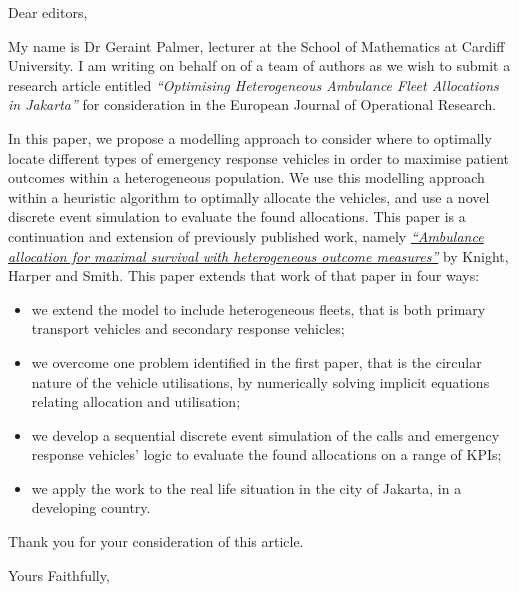 \documentclass{letter}
\begin{document}
\begin{letter}{}
\opening{Dear editors,}

My name is Dr Geraint Palmer, lecturer at the School of Mathematics at Cardiff University. I am writing on behalf on of a team of authors as we wish to submit a research article entitled \textit{``Optimising Heterogeneous Ambulance Fleet Allocations in Jakarta''} for consideration in the European Journal of Operational Research.

In this paper, we propose a modelling approach to consider where to optimally locate different types of emergency response vehicles in order to maximise patient outcomes within a heterogeneous population. We use this modelling approach within a heuristic algorithm to optimally allocate the vehicles, and use a novel discrete event simulation to evaluate the found allocations.
This paper is a continuation and extension of previously published work, namely \href{https://www.sciencedirect.com/science/article/pii/S0305048312000436?casa_token=1SiRonMwOYIAAAAA:AnZOLnmzNdYATlXDMYjqnQHEZX701o1eaBypnyMpgQbqoR62Z57aX1SXAadw4GJAku8gNvc}{\textit{``Ambulance allocation for maximal survival with heterogeneous outcome measures''}} by Knight, Harper and Smith.
This paper extends that work of that paper in four ways:

\begin{itemize}
  \item we extend the model to include heterogeneous fleets, that is both primary transport vehicles and secondary response vehicles;
  \item we overcome one problem identified in the first paper, that is the circular nature of the vehicle utilisations, by numerically solving implicit equations relating allocation and utilisation;
  \item we develop a sequential discrete event simulation of the calls and emergency response vehicles' logic to evaluate the found allocations on a range of KPIs;
  \item we apply the work to the real life situation in the city of Jakarta, in a developing country.
\end{itemize}

Thank you for your consideration of this article.

\closing{Yours Faithfully,}

\end{letter}
\end{document}

